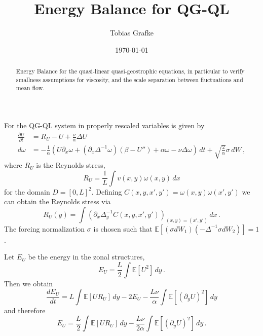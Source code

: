 \documentclass[11pt]{amsart}
\def\EE{\mathbb{E}}\def\PP{\mathbb{P}}
\begin{document}
\title{Energy Balance for QG-QL}
\date{\today}
\author{Tobias Grafke}

\begin{abstract}
  Energy Balance for the quasi-linear quasi-geostrophic equations, in
  particular to verify smallness assumptions for viscosity, and the
  scale separation between fluctuations and mean flow.
\end{abstract}

\maketitle

For the QG-QL system in properly rescaled variables is given by
\begin{subequations}
  \begin{align}
    \frac{\partial U}{\partial t} &= R_U - U + \frac{\nu}{\alpha} \Delta U\\
    d\omega &= -\frac1\alpha\left(U\partial_x \omega + (\partial_x \Delta^{-1}\omega)(\beta-U'') +\alpha \omega - \nu\Delta\omega\right)\,dt + \sqrt{\frac2\alpha}\sigma\,dW\,,
  \end{align}
\end{subequations}
where $R_U$ is the Reynolds stress,
\begin{equation}
  R_U = \frac1L\int v(x,y)\omega(x,y)\,dx
\end{equation}
for the domain $D=[0,L]^2$. Defining $C(x,y,x',y') =
\omega(x,y)\omega(x',y')$ we can obtain the Reynolds stress via
\begin{equation}
  R_U(y) = \int\left(\partial_x \Delta_y^{-1} C(x,y,x',y')\right)_{(x,y)=(x',y')}\,dx\,.
\end{equation}
The forcing normalization $\sigma$ is chosen such that $\EE[(\sigma
  dW_1)(-\Delta^{-1}\sigma dW_2)] = 1$.

Let $E_U$ be the energy in the zonal structures,
\begin{equation}
  E_U = \frac L2 \int \EE [U^2]\,dy\,.
\end{equation}
Then we obtain
\begin{equation}
  \frac{dE_U}{dt} = L\int \EE [UR_U]\,dy - 2E_U - \frac{L\nu}{\alpha} \int\EE[(\partial_y U)^2]\,dy
\end{equation}
and therefore
\begin{equation}
  E_U = \frac L2 \int \EE [UR_U]\,dy - \frac{L\nu}{2\alpha} \int\EE[(\partial_y U)^2]\,dy\,.
\end{equation}
\end{document}
